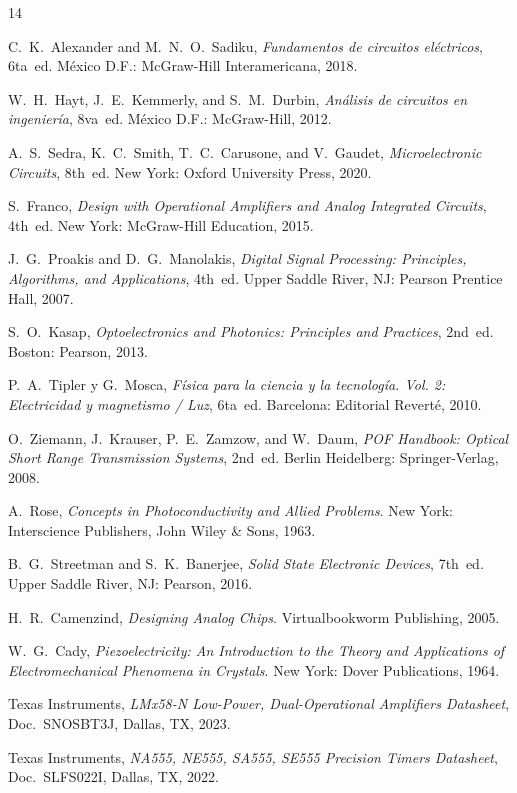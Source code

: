 \documentclass[11pt,letterpaper]{article}
\begin{document}
\begin{thebibliography}{14}

C.~K.~Alexander and M.~N.~O.~Sadiku, \emph{Fundamentos de circuitos eléctricos}, 6ta~ed. México D.F.: McGraw-Hill Interamericana, 2018.

W.~H.~Hayt, J.~E.~Kemmerly, and S.~M.~Durbin, \emph{Análisis de circuitos en ingeniería}, 8va~ed. México D.F.: McGraw-Hill, 2012.

A.~S.~Sedra, K.~C.~Smith, T.~C.~Carusone, and V.~Gaudet, \emph{Microelectronic Circuits}, 8th~ed. New York: Oxford University Press, 2020.

S.~Franco, \emph{Design with Operational Amplifiers and Analog Integrated Circuits}, 4th~ed. New York: McGraw-Hill Education, 2015.

J.~G.~Proakis and D.~G.~Manolakis, \emph{Digital Signal Processing: Principles, Algorithms, and Applications}, 4th~ed. Upper Saddle River, NJ: Pearson Prentice Hall, 2007.

S.~O.~Kasap, \emph{Optoelectronics and Photonics: Principles and Practices}, 2nd~ed. Boston: Pearson, 2013.

P.~A.~Tipler y G.~Mosca, \emph{Física para la ciencia y la tecnología. Vol. 2: Electricidad y magnetismo / Luz}, 6ta~ed. Barcelona: Editorial Reverté, 2010.

O.~Ziemann, J.~Krauser, P.~E.~Zamzow, and W.~Daum, \emph{POF Handbook: Optical Short Range Transmission Systems}, 2nd~ed. Berlin Heidelberg: Springer-Verlag, 2008.

A.~Rose, \emph{Concepts in Photoconductivity and Allied Problems}. New York: Interscience Publishers, John Wiley \& Sons, 1963.

B.~G.~Streetman and S.~K.~Banerjee, \emph{Solid State Electronic Devices}, 7th~ed. Upper Saddle River, NJ: Pearson, 2016.

H.~R.~Camenzind, \emph{Designing Analog Chips}. Virtualbookworm Publishing, 2005.

W.~G.~Cady, \emph{Piezoelectricity: An Introduction to the Theory and Applications of Electromechanical Phenomena in Crystals}. New York: Dover Publications, 1964.

Texas Instruments, \emph{LMx58-N Low-Power, Dual-Operational Amplifiers Datasheet}, Doc.~SNOSBT3J, Dallas, TX, 2023.

Texas Instruments, \emph{NA555, NE555, SA555, SE555 Precision Timers Datasheet}, Doc.~SLFS022I, Dallas, TX, 2022.

\end{thebibliography}
\end{document}
